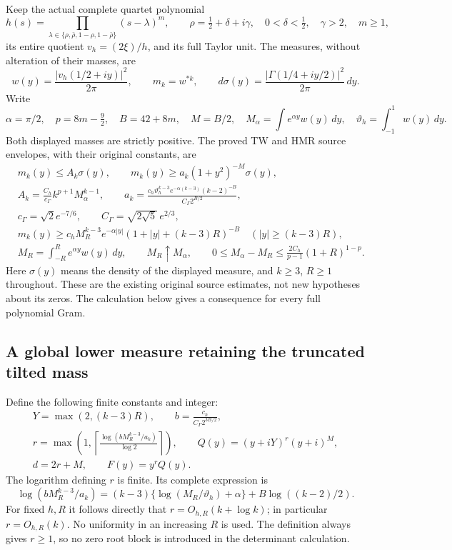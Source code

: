 \documentclass[11pt,a4paper]{article}
\begin{document}
Keep the actual complete quartet polynomial
\[
 h(s)=\prod_{\lambda\in\{\rho,\bar\rho,1-\rho,1-\bar\rho\}}(s-\lambda)^m,
 \qquad \rho=\tfrac12+\delta+i\gamma,\quad
 0<\delta<\tfrac12,\quad \gamma>2,\quad m\geq1,
\]
its entire quotient $v_h=(2\xi)/h$, and its full Taylor unit.
The measures, without alteration of their masses, are
\[
 w(y)=\frac{|v_h(1/2+iy)|^2}{2\pi},\qquad m_k=w^{*k},
 \qquad d\sigma(y)=\frac{|\Gamma(1/4+iy/2)|^2}{2\pi}\,dy.
 \tag{DMR1}
\]
Write
\[
 \alpha=\pi/2,\quad p=8m-\tfrac92,\quad B=42+8m,\quad M=B/2,
 \quad M_\alpha=\int e^{\alpha y}w(y)\,dy,\quad
 \vartheta_h=\int_{-1}^1w(y)\,dy.
\]
Both displayed masses are strictly positive. The proved TW and HMR
source envelopes, with their original constants, are
\[
 \begin{split}
 &m_k(y)\leq A_k\sigma(y),\qquad
 m_k(y)\geq a_k(1+y^2)^{-M}\sigma(y),\\
 &A_k=\frac{C_h}{c_\Gamma}k^{p+1}M_\alpha^{k-1},\qquad
 a_k=\frac{c_h\vartheta_h^{k-3}e^{-\alpha(k-3)}(k-2)^{-B}}
                  {C_\Gamma 2^{B/2}},\\
 &c_\Gamma=\sqrt2 e^{-7/6},\qquad
 C_\Gamma=\sqrt{2\sqrt5}\,e^{2/3},\\
 &m_k(y)\geq c_h M_R^{k-3}e^{-\alpha|y|}
              (1+|y|+(k-3)R)^{-B}\quad
                         (|y|\geq(k-3)R),\\
 &M_R=\int_{-R}^R e^{\alpha y}w(y)\,dy,\qquad
 M_R\uparrow M_\alpha,\qquad
 0\leq M_\alpha-M_R\leq
       \frac{2C_h}{p-1}(1+R)^{1-p}.
 \end{split}\tag{DMR2}
\]
Here $\sigma(y)$ means the density of the displayed measure,
and $k\geq3$, $R\geq1$ throughout. These are the existing original
source estimates, not new hypotheses about its zeros. The calculation
below gives a consequence for every full polynomial Gram.

\subsection{A global lower measure retaining the truncated tilted mass}

Define the following finite constants and integer:
\[
 \begin{gathered}
 Y=\max(2,(k-3)R),\qquad b=\frac{c_h}{C_\Gamma 2^{3B/2}},\\
 r=\max\left(1,\left\lceil
       \frac{\log(bM_R^{k-3}/a_k)}{\log2}\right\rceil\right),\qquad
 Q(y)=(y+iY)^r(y+i)^M,\\
 d=2r+M,\qquad F(y)=y^rQ(y).
 \end{gathered}\tag{DMR3}
\]
The logarithm defining $r$ is finite. Its complete expression is
\[
 \log(bM_R^{k-3}/a_k)
 =(k-3)\{\log(M_R/\vartheta_h)+\alpha\}
                    +B\log((k-2)/2).
 \tag{DMR4}
\]
For fixed $h,R$ it follows directly that $r=O_{h,R}(k+\log k)$;
in particular $r=O_{h,R}(k)$. No uniformity in an increasing $R$
is used. The definition always gives $r\geq1$, so no zero
root block is introduced in the determinant calculation.
\end{document}

